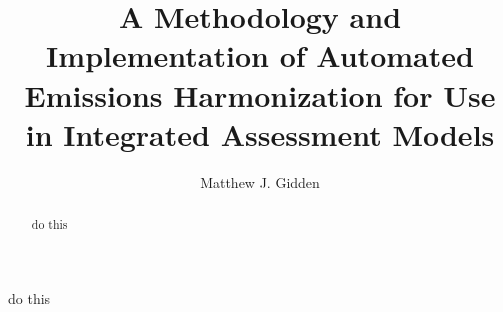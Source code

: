 

\begin{frontmatter}

\title{A Methodology and Implementation of Automated Emissions Harmonization for Use in Integrated Assessment Models}

\author[iiasa,uw]{Matthew J. Gidden}
\address[iiasa]{International Institute for Applied Systems Analysis,
  Schlossplatz 1, A-2361 Laxenburg, Austria}

\begin{abstract}
\TODO do this \cite{Dirac1953888}
\end{abstract}

\begin{keyword}
\TODO do this
\end{keyword}

\end{frontmatter}

\linenumbers
